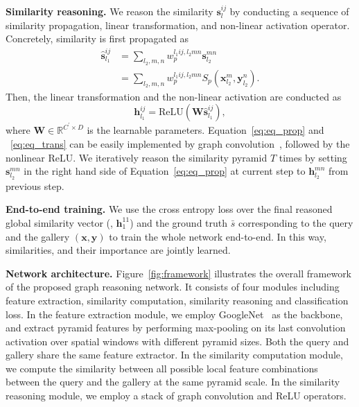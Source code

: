 \documentclass[10pt,twocolumn,letterpaper]{article}
\begin{document}
\textbf{Similarity reasoning.} We reason the similarity  $\mathbf{s}_l^{ij}$ by conducting  a sequence of similarity propagation, linear transformation, and non-linear activation operator. Concretely, similarity is first propagated as
\begin{align}
\hat{\mathbf{s}}_{l_1}^{ij}&=\sum\limits_{l_2,m,n}{w_p^{l_1ij,l_2mn}\mathbf{s}_{l_2}^{mn}} \label{eq:eq_prop} \\
&=\sum\limits_{l_2,m,n}{w_p^{l_1ij,l_2mn}S_p(\mathbf{x}_{l_2}^m,\mathbf{y}_{l_2}^n)}. \label{eq:eq_prop1}
\end{align}
Then, the linear transformation and the non-linear activation are conducted as
\begin{equation}
\mathbf{h}_{l_1}^{ij}=\text{ReLU}(\mathbf{W}\hat{\mathbf{s}}_{l_1}^{ij}), \label{eq:eq_trans}
\end{equation}
where $\mathbf{W}\in \mathbb{R}^{C^{'}\times D}$ is the learnable parameters. Equation~\ref{eq:eq_prop} and ~\ref{eq:eq_trans} can be easily implemented by graph convolution~\cite{Kipf2017}, followed by the nonlinear ReLU. We iteratively reason the similarity pyramid $T$ times by setting $\mathbf{s}_{l_2}^{mn}$ in the right hand side of Equation~\ref{eq:eq_prop} at current step to $\mathbf{h}_{l_2}^{mn}$ from previous step.

\textbf{End-to-end training.} {We use the cross entropy loss over the final reasoned global similarity vector (\ie, $\mathbf{h}_1^{11}$)  and the ground truth $\bar s$ corresponding to the query and the gallery $(\mathbf{x},\mathbf{y})$ to train the whole network end-to-end. In this way, similarities, and their importance are jointly learned.}



\textbf{Network architecture.} Figure~\ref{fig:framework} illustrates the overall framework of the proposed graph reasoning network. It consists of four modules including feature extraction, similarity computation, similarity reasoning and classification loss. In the feature extraction module, we employ GoogleNet~\cite{Szegedy2014} as the backbone, and extract pyramid features by performing max-pooling on its last convolution activation over spatial windows with different pyramid sizes. Both the query and gallery share the same feature extractor.
In the similarity computation module, we compute the similarity between all possible local feature combinations between the query and the gallery at the same pyramid scale. In the similarity reasoning module, we employ a stack of graph convolution and ReLU operators.
\end{document}
